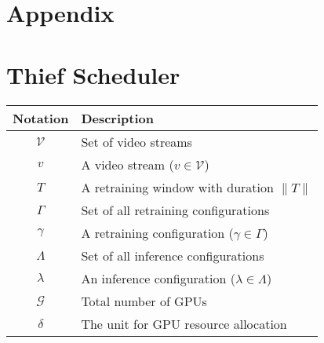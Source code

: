 \section{Appendix}

\section{Thief Scheduler}
\label{appendix:scheduler}
\begin{table}[t!]
\footnotesize
\begin{tabular}{cl}
{\bf Notation} & {\bf Description}\\\hline
$\mathcal{V}$ & Set of video streams\\
$v$ & A video stream ($v \in \mathcal{V}$)\\\hline
$T$ & A retraining window with duration $\lVert T \rVert$ \\\hline
$\Gamma$ & Set of all retraining configurations\\
$\gamma$ & A retraining configuration ($\gamma \in \Gamma$)\\\hline
$\Lambda$ & Set of all inference configurations\\
$\lambda$ & An inference configuration ($\lambda \in \Lambda$)\\\hline
$\mathcal{G}$ & Total number of GPUs\\
$\delta$ & The unit for GPU resource allocation \\\hline

\end{tabular}
\end{table}
